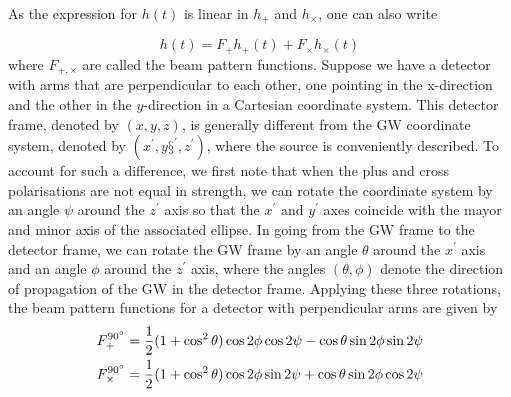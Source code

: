 \documentclass[binding=0.6cm, LaM]{sapthesis}
\begin{document}
As the expression for $h(t)$ is linear in $h_{+}$ and $h_{\times}$, one can also write

\begin{equation}
h(t) = F_{+}h_{+} (t) + F_{\times}h_{\times}(t)
\end{equation}
where $F_{+,\times}$ are called the beam pattern functions. Suppose we have a detector with arms that are perpendicular to each other, one pointing in the x-direction and the other 
in the $y$-direction in a Cartesian coordinate system. This detector frame, denoted by $(x,y,z)$, is generally different from the GW coordinate system, denoted by $(x^\prime,y§^\prime,z^\prime)$, where the source 
is conveniently described. To account for such a difference, we first note that when the plus and cross polarisations are not equal in strength, we can rotate the coordinate system by 
an angle $\psi$ around the $z^\prime$ axis so that the $x^\prime$ and $y^\prime$ axes coincide with the mayor and minor axis of the associated ellipse.
 In going from the GW frame to the detector frame, we can rotate the GW frame by an angle $\theta$ around the $x^\prime$ axis and an angle $\phi$ around the $z^\prime$ axis, 
where the angles $(\theta, \phi)$ denote the direction of propagation of the GW in the detector frame. 
Applying these three rotations, the beam pattern functions for a detector with perpendicular arms are given by 
\begin{align}
F_{+}^{\ang{90}}& = {1 \over 2} (1 + \cos^2 \theta)\cos 2\phi \cos 2 \psi - \cos \theta \sin2\phi \sin2\psi \\
F_{\times}^{\ang{90}}& = {1 \over 2} (1 + \cos^2 \theta)\cos 2\phi \sin 2 \psi + \cos \theta \sin2\phi \cos2\psi
\end{align}
\end{document}
